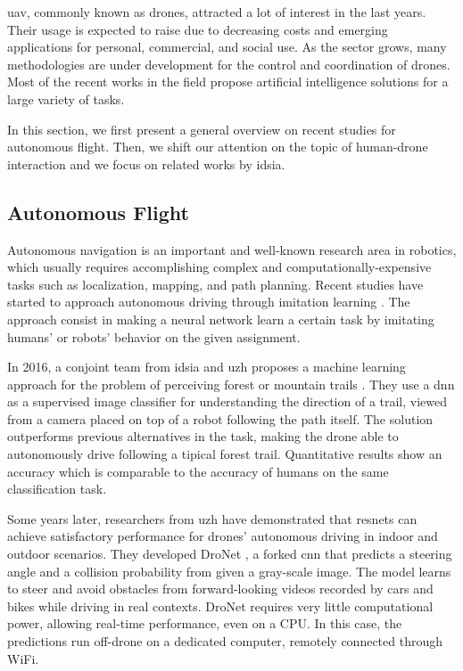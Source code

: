 \gls{uav}, commonly known as drones, attracted a lot of interest in the last years. Their usage is expected to raise due to decreasing costs and emerging applications for personal, commercial, and social use. As the sector grows, many methodologies are under development for the control and coordination of drones. Most of the recent works in the field propose artificial intelligence solutions for a large variety of tasks.

In this section, we first present a general overview on recent studies for autonomous flight. Then, we shift our attention on the topic of human-drone interaction and we focus on related works by \gls{idsia}.



\subsection{Autonomous Flight}
\label{subsec:drone-auto-drive}

Autonomous navigation is an important and well-known research area in robotics, which usually requires accomplishing complex and computationally-expensive tasks such as localization, mapping, and path planning. Recent studies have started to approach autonomous driving through imitation learning \cite{imitation_learning_survey}. The approach consist in making a neural network learn a certain task by imitating humans' or robots' behavior on the given assignment.

In 2016, a conjoint team from \gls{idsia} and \gls{uzh} proposes a machine learning approach for the problem of perceiving forest or mountain trails \cite{giusti2016machine}. They use a \gls{dnn} as a supervised image classifier for understanding the direction of a trail, viewed from a camera placed on top of a robot following the path itself. The solution outperforms previous alternatives in the task, making the drone able to autonomously drive following a tipical forest trail. Quantitative results show an accuracy which is comparable to the accuracy of humans on the same classification task.

Some years later, researchers from \gls{uzh} have demonstrated that \gls{resnet}s can achieve satisfactory performance for drones' autonomous driving in indoor and outdoor scenarios. They developed DroNet \cite{Loquercio_2018}, a forked \gls{cnn} that predicts a steering angle and a collision probability from given a gray-scale image. The model learns to steer and avoid obstacles from forward-looking videos recorded by cars and bikes while driving in real contexts. DroNet requires very little computational power, allowing real-time performance, even on a CPU. In this case, the predictions run off-drone on a dedicated computer, remotely connected through WiFi.



